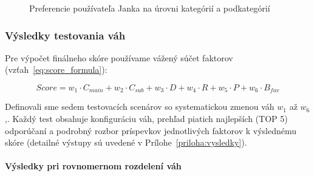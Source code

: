 \begin{figure}[H]
\centering
\begin{minipage}{0.48\textwidth}
    \centering
    \caption{Hlavné kategórie}
\end{minipage}
\hfill
\begin{minipage}{0.48\textwidth}
    \centering
    \caption{Podkategórie}
\end{minipage}
\caption{Preferencie používateľa Janka na úrovni kategórií a podkategórií}
\label{fig:porovnanie_grafov}
\end{figure}

\subsubsection{Výsledky testovania váh}

Pre výpočet finálneho skóre používame vážený súčet faktorov
(vzťah~\ref{eq:score_formula}):

\begin{equation}
Score = w_1 \cdot C_{main} + w_2 \cdot C_{sub} + w_3 \cdot D + w_4 \cdot R + w_5 \cdot P + w_6 \cdot B_{fav}
\label{eq:score_formula}
\end{equation}

Definovali sme sedem testovacích scenárov so systematickou zmenou 
váh $w_1$ až $w_6$,. Každý test obsahuje konfiguráciu váh,
  prehľad piatich najlepších (TOP 5) odporúčaní a podrobný rozbor príspevkov jednotlivých faktorov
 k výslednému skóre (detailné výstupy sú uvedené v Prílohe~\ref{priloha:vysledky}).

\paragraph{Výsledky pri rovnomernom rozdelení váh}

